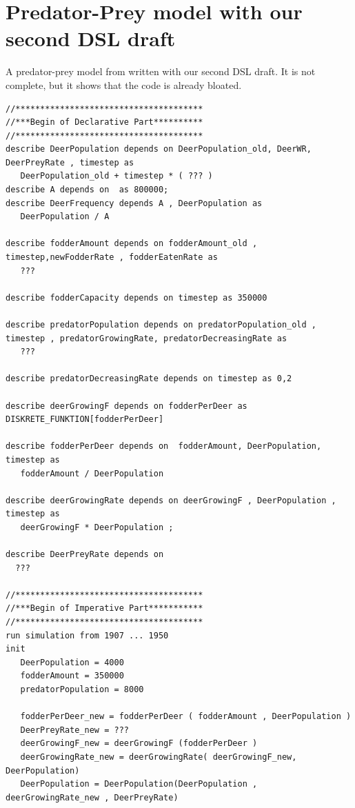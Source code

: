 \section{Predator-Prey model with our second DSL draft}
\par
A predator-prey model from \autocite{dsl:dynamo} written with our second DSL draft. It is not complete, but it shows that the code is already bloated.
\newline
\begin{lstlisting}
//**************************************
//***Begin of Declarative Part**********
//**************************************
describe DeerPopulation depends on DeerPopulation_old, DeerWR, DeerPreyRate , timestep as
   DeerPopulation_old + timestep * ( ??? )
describe A depends on  as 800000;
describe DeerFrequency depends A , DeerPopulation as
   DeerPopulation / A  

describe fodderAmount depends on fodderAmount_old , timestep,newFodderRate , fodderEatenRate as
   ???

describe fodderCapacity depends on timestep as 350000

describe predatorPopulation depends on predatorPopulation_old , timestep , predatorGrowingRate, predatorDecreasingRate as
   ???

describe predatorDecreasingRate depends on timestep as 0,2

describe deerGrowingF depends on fodderPerDeer as  DISKRETE_FUNKTION[fodderPerDeer]

describe fodderPerDeer depends on  fodderAmount, DeerPopulation, timestep as
   fodderAmount / DeerPopulation

describe deerGrowingRate depends on deerGrowingF , DeerPopulation , timestep as
   deerGrowingF * DeerPopulation ;       

describe DeerPreyRate depends on
  ???

//**************************************
//***Begin of Imperative Part***********
//**************************************
run simulation from 1907 ... 1950
init
   DeerPopulation = 4000
   fodderAmount = 350000
   predatorPopulation = 8000  

   fodderPerDeer_new = fodderPerDeer ( fodderAmount , DeerPopulation )
   DeerPreyRate_new = ???
   deerGrowingF_new = deerGrowingF (fodderPerDeer )
   deerGrowingRate_new = deerGrowingRate( deerGrowingF_new, DeerPopulation)
   DeerPopulation = DeerPopulation(DeerPopulation , deerGrowingRate_new , DeerPreyRate)
\end{lstlisting}

















 







